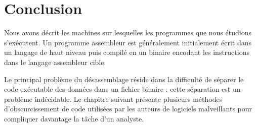 \section*{Conclusion}
Nous avons décrit les machines sur lesquelles les programmes que nous étudions s'exécutent.
Un programme assembleur est généralement initialement écrit dans un langage de haut niveau puis compilé en un binaire encodant les instructions dans le langage assembleur cible.

Le principal problème du désassemblage réside dans la difficulté de séparer le code exécutable des données dans un fichier binaire : cette séparation est un problème indécidable.
Le chapitre suivant présente plusieurs méthodes d'obscurcissement de code utilisées par les auteurs de logiciels malveillants pour compliquer davantage la tâche d'un analyste.
